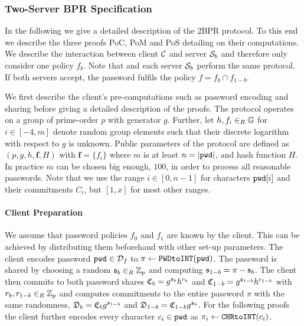\subsubsection{Two-Server BPR Specification}\label{sec:protocol}
In the following we give a detailed description of the \ac{2BPR} protocol.
To this end we describe the three proofs \ac{PoC}, \ac{PoM} and \ac{PoS} detailing on their computations.
We describe the interaction between client $\mathcal{C}$ and server $\mathcal{S}_b$ and therefore only consider one policy $f_b$.
Note that \Client and each server $\mathcal{S}_b$ perform the same protocol.
If both servers accept, the password fulfils the policy $f=f_b\cap f_{1-b}$.

We first describe the client's pre-computations such as password encoding and sharing before giving a detailed description of the proofs.
The protocol operates on a group \GG of prime-order $p$ with generator $g$.
Further, let $h,f_i\in_R \mathbb{G}$ for $i\in[-4,m]$ denote random group elements such that their discrete logarithm with respect to $g$ is unknown.
Public parameters of the protocol are defined as $(p,g,h,\bm f, H)$ with $\bm f = \{f_i\}$ where $m$ is at least $n=|\mathtt{pwd}|$, and hash function $H$.
In practice $m$ can be chosen big enough, \eg $100$, in order to process all reasonable passwords.
Note that we use the range $i\in[0,n-1]$ for characters $\mathtt{pwd}[i]$ and their commitments $C_i$, but $[1,x]$ for most other ranges.

\paragraph{Client Preparation}
We assume that password policies $f_0$ and $f_1$ are known by the client.
This can be achieved by distributing them beforehand with other set-up parameters.
The client encodes password $\mathtt{pwd}\in\mathcal{D}_f$ to $\pi\gets\texttt{PWDtoINT}(\mathtt{pwd})$.
The password is shared by choosing a random $\mathfrak{s}_{b}\in_R\mathbb{Z}_p$ and computing $\mathfrak{s}_{1-b}=\pi-\mathfrak{s}_{b}$.
The client then commits to both password shares $\mathfrak{C}_b=g^{\mathfrak{s}_{b}}h^{r_b}$ and $\mathfrak{C}_{1-b}=g^{\mathfrak{s}_{1-b}}h^{r_{1-b}}$ with $r_b,r_{1-b}\in_R\mathbb{Z}_p$ and computes commitments to the entire password $\pi$ with the same randomness, \ie $\mathfrak{D}_b=\mathfrak{C}_b g^{\mathfrak{s}_{1-b}}$ and $\mathfrak{D}_{1-b}=\mathfrak{C}_{1-b} g^{\mathfrak{s}_{b}}$.
For the following proofs the client further encodes every character $c_i\in\mathtt{pwd}$ as $\pi_i\gets\texttt{CHRtoINT}(c_i)$.

